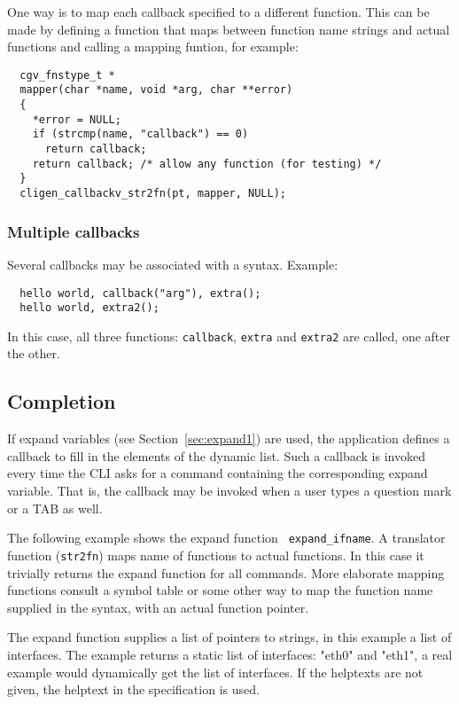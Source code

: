 \documentclass[a4paper, 10pt] {article}
\begin{document}
One way is to map each callback specified to a different
function. This can be made by defining a function that maps between
function name strings and actual functions and calling a mapping
funtion, for example:
\begin{verbatim}
  cgv_fnstype_t *
  mapper(char *name, void *arg, char **error)
  {
    *error = NULL;
    if (strcmp(name, "callback") == 0)
      return callback;
    return callback; /* allow any function (for testing) */
  }
  cligen_callbackv_str2fn(pt, mapper, NULL);
\end{verbatim}

\subsubsection{Multiple callbacks}
Several callbacks may be associated with a syntax. Example:
\begin{verbatim}
  hello world, callback("arg"), extra();
  hello world, extra2();
\end{verbatim}
In this case, all three functions: {\tt callback}, {\tt extra} and {\tt extra2} are called, one after the other.

\subsection{Completion}
\label{sec:expand}

If expand variables (see Section~\ref{sec:expand1}) are used, the
application defines a callback to fill in the elements of the dynamic
list. Such a callback is invoked every time the CLI asks for a command
containing the corresponding expand variable. That is, the callback
may be invoked when a user types a question mark or a TAB as well.

The following example shows the expand function {\tt
  expand\_ifname}. A translator function ({\tt str2fn}) maps name of
functions to actual functions. In this case it trivially returns the
expand function for all commands. More elaborate mapping functions
consult a symbol table or some other way to map the function name
supplied in the syntax, with an actual function pointer.

The expand function supplies a list of pointers to strings, in this
example a list of interfaces. The example returns a static list of
interfaces: "eth0" and "eth1", a real example would dynamically get
the list of interfaces. If the helptexts are not given, the helptext
in the specification is used.
\end{document}
